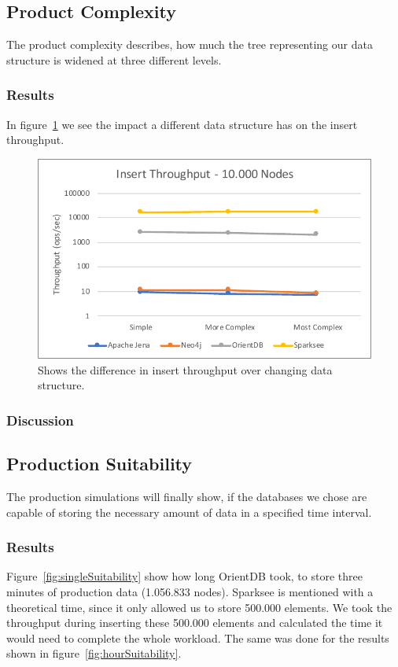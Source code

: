 \subsection{Product Complexity}
\label{ch:evaluation:se:productComplexity}
The product complexity describes,
how much the tree representing our data structure is widened at three different levels.

\subsubsection{Results}
In figure~\ref{fig:structure} we see the impact a different data structure has on the insert throughput.

\begin{figure}[h!]
  \centering
  \includegraphics[width=.5\textwidth]{images/production/structure}
  \caption{Shows the difference in insert throughput over changing data structure.}
  \label{fig:structure}
\end{figure}

\subsubsection{Discussion}

\subsection{Production Suitability}
\label{ch:evaluation:se:productionSuitability}
The production simulations will finally show,
if the databases we chose are capable of storing the necessary amount of data in a specified time interval.

\subsubsection{Results}
Figure~\ref{fig:singleSuitability} show how long OrientDB took,
to store three minutes of production data (1.056.833 nodes).
Sparksee is mentioned with a theoretical time,
since it only allowed us to store 500.000 elements.
We took the throughput during inserting these 500.000 elements and calculated the time it would need to complete the whole workload.
The same was done for the results shown in figure~\ref{fig:hourSuitability}.

